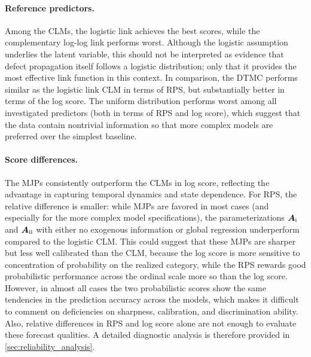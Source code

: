 \documentclass{article}
\newcommand{\RN}[1]{\textup{\uppercase\expandafter{\romannumeral#1}}}
\begin{document}
\paragraph{Reference predictors.}
Among the CLMs, the logistic link achieves the best scores, while the complementary log-log link performs worst. Although the logistic assumption underlies the latent variable, this should not be interpreted as evidence that defect propagation itself follows a logistic distribution; only that it provides the most effective link function in this context. 
In comparison, the DTMC performs similar as the logistic link CLM in terms of RPS, but substantially better in terms of the log score.
The uniform distribution performs worst among all investigated predictors (both in terms of RPS and log score), which suggest that the data contain nontrivial information so that more complex models are preferred over the simplest baseline. 


\paragraph{Score differences.}
The MJPs consistently outperform the CLMs in log score, reflecting the advantage in capturing temporal dynamics and state dependence. For RPS, the relative difference is smaller: while MJPs are favored in most cases (and especially for the more complex model specifications), the parameterizations $\bm{A}_{\RN{1}}$ and $\bm{A}_{\RN{2}}$ with either no exogenous information or global regression underperform compared to the logistic CLM. This could suggest that these MJPs are sharper but less well calibrated than the CLM, because the log score is more sensitive to concentration of probability on the realized category, while the RPS rewards good probabilistic performance across the ordinal scale more so than the log score.
However, in almost all cases the two probabilistic scores show the same tendencies in the prediction accuracy across the models, which makes it difficult to comment on deficiencies on sharpness, calibration, and discrimination ability. Also, relative differences in RPS and log score alone are not enough to evaluate these forecast qualities. A detailed diagnostic analysis is therefore provided in \cref{sec:reliability_analysis}.
\end{document}
